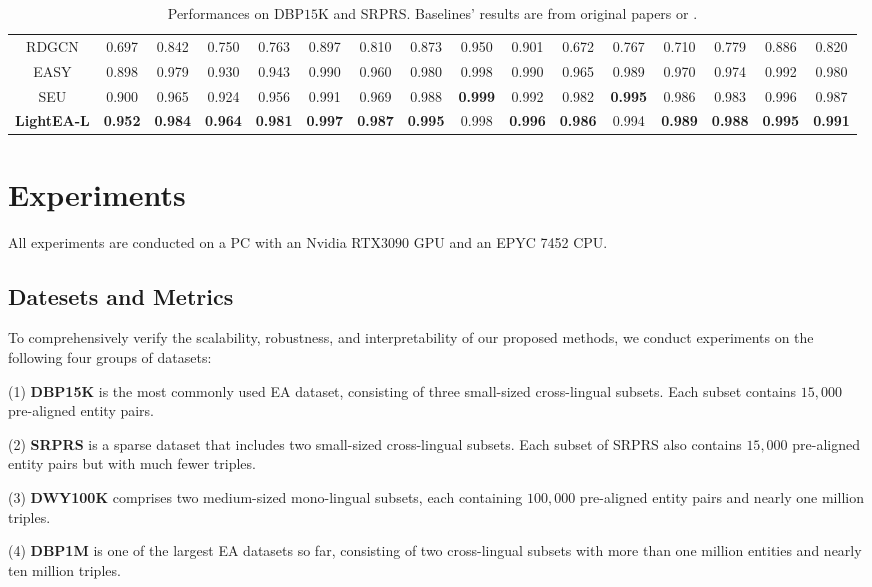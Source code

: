 \documentclass[11pt]{article}
\begin{document}
\begin{table*}[t]
\begin{center}
{\begin{tabular}{c|ccc|ccc|ccc|ccc|ccc}
  RDGCN & 0.697 & 0.842 & 0.750 & 0.763 & 0.897 & 0.810 & 0.873 & 0.950 & 0.901  &0.672&0.767& 0.710&0.779&0.886&0.820 \\
  EASY &0.898& 0.979& 0.930 &0.943 &0.990 &0.960 &0.980 &0.998 &0.990 &0.965 &0.989 &0.970 &0.974 &0.992 &0.980\\
  SEU &0.900 &0.965 &0.924 &0.956 &0.991 &0.969 &0.988 &\textbf{0.999} &0.992 &0.982 &\textbf{0.995} &0.986 &0.983 &0.996 &0.987\\
  \textbf{LightEA-L} &\textbf{0.952}&\textbf{0.984}&\textbf{0.964}&\textbf{0.981}&\textbf{0.997}&\textbf{0.987}&\textbf{0.995}&0.998&\textbf{0.996}&\textbf{0.986}&0.994&\textbf{0.989}&\textbf{0.988 }&\textbf{0.995}&\textbf{0.991}\\
  \bottomrule
\end{tabular}
}
\caption{Performances on DBP$15$K and SRPRS. Baselines' results are from original papers or \citet{9174835}.}
\label{table:res1}
\end{center}
\end{table*}

\section{Experiments}
All experiments are conducted on a PC with an Nvidia RTX$3090$ GPU and an EPYC 7452 CPU.

\subsection{Datesets and Metrics}
To comprehensively verify the scalability, robustness, and interpretability of our proposed methods, we conduct experiments on the following four groups of datasets:

(1) \textbf{DBP15K} \cite{DBLP:conf/semweb/SunHL17} is the most commonly used EA dataset, consisting of three small-sized cross-lingual subsets.
Each subset contains $15,000$ pre-aligned entity pairs.

(2) \textbf{SRPRS} \cite{DBLP:conf/icml/GuoSH19} is a sparse dataset that includes two small-sized cross-lingual subsets.
Each subset of SRPRS also contains $15,000$ pre-aligned entity pairs but with much fewer triples.

(3) \textbf{DWY100K} \cite{DBLP:conf/ijcai/SunHZQ18} comprises two medium-sized mono-lingual subsets, each containing $100,000$ pre-aligned entity pairs and nearly one million triples.

(4) \textbf{DBP1M} \cite{DBLP:journals/pvldb/GeLCZG21} is one of the largest EA datasets so far, consisting of two cross-lingual subsets with more than one million entities and nearly ten million triples.
\end{document}
